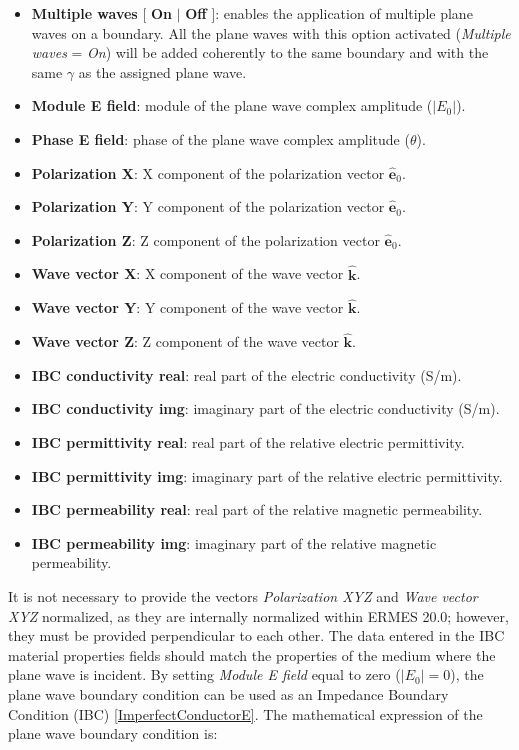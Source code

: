 \begin{itemize}\itemsep0em 
	\item \textbf{Multiple waves} [ \textbf{On} $\mid$ \textbf{Off} ]: enables the application of multiple plane waves on a boundary. All the plane waves with this option activated (\emph{Multiple waves} = \textit{On}) will be added coherently to the same boundary and with the same $\gamma$ as the assigned plane wave.
	\\
	\item \textbf{Module E field}: module of the plane wave complex amplitude ($|E_{0}|$).
	\item \textbf{Phase E field}: phase of the plane wave complex amplitude ($\theta$).
	\\
	\item \textbf{Polarization X}: X component of the polarization vector $\mathbf{\hat{e}}_{0}$.
	\item \textbf{Polarization Y}: Y component of the polarization vector $\mathbf{\hat{e}}_{0}$.
	\item \textbf{Polarization Z}: Z component of the polarization vector $\mathbf{\hat{e}}_{0}$.
	\\
	\item \textbf{Wave vector X}: X component of the wave vector $\mathbf{\hat{k}}$.
	\item \textbf{Wave vector Y}: Y component of the wave vector $\mathbf{\hat{k}}$.
	\item \textbf{Wave vector Z}: Z component of the wave vector $\mathbf{\hat{k}}$.
	\\
	\item \textbf{IBC conductivity real}: real part of the electric conductivity (S/m). 
	\item \textbf{IBC conductivity  img}: imaginary part of the electric conductivity (S/m). 
	\\
	\item \textbf{IBC permittivity real}: real part of the relative electric permittivity.
	\item \textbf{IBC permittivity  img}: imaginary part of the relative electric permittivity.
	\\
	\item \textbf{IBC permeability real}: real part of the relative magnetic permeability.
	\item \textbf{IBC permeability  img}: imaginary part of the relative magnetic permeability.
\end{itemize}
It is not necessary to provide the vectors \emph{Polarization XYZ} and \emph{Wave vector XYZ} normalized, as they are internally normalized within ERMES 20.0; however, they must be provided perpendicular to each other. The data entered in the IBC material properties fields should match the properties of the medium where the plane wave is incident. By setting \emph{Module E field} equal to zero ($|E_{0}| = 0$), the plane wave boundary condition can be used as an Impedance Boundary Condition (IBC) \eqref{ImperfectConductorE}. The mathematical expression of the plane wave boundary condition is:
